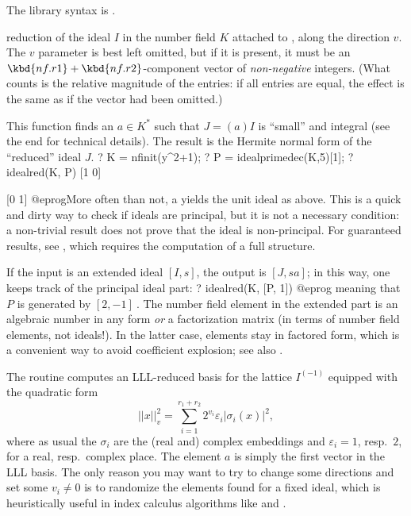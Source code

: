 The library syntax is .

\label{se:idealred}
 reduction of
the ideal $I$ in the number field $K$ attached to , along the
direction $v$. The $v$ parameter is best left omitted, but if it is present,
it must be an $\kbd{nf.r1} + \kbd{nf.r2}$-component vector of
\emph{non-negative} integers. (What counts is the relative magnitude of the
entries: if all entries are equal, the effect is the same as if the vector
had been omitted.)

This function finds an $a\in K^*$ such that $J = (a)I$ is
``small'' and integral (see the end for technical details).
The result is the Hermite normal form of
the ``reduced'' ideal $J$.
\bprog
? K = nfinit(y^2+1);
? P = idealprimedec(K,5)[1];
? idealred(K, P)
[1 0]

[0 1]
@eprog\noindent More often than not, a  yields the unit
ideal as above. This is a quick and dirty way to check if ideals are principal,
but it is not a necessary condition: a non-trivial result does not prove that
the ideal is non-principal. For guaranteed results, see ,
which requires the computation of a full  structure.

If the input is an extended ideal $[I,s]$, the output is $[J, sa]$; in
this way, one keeps track of the principal ideal part:
\bprog
? idealred(K, [P, 1])
@eprog\noindent
meaning that $P$ is generated by $[2, -1]~$. The number field element in the
extended part is an algebraic number in any form \emph{or} a factorization
matrix (in terms of number field elements, not ideals!). In the latter case,
elements stay in factored form, which is a convenient way to avoid
coefficient explosion; see also .

 The routine computes an LLL-reduced
basis for the lattice $I^(-1)$ equipped with the quadratic
form
$$|| x ||_v^2 = \sum_{i=1}^{r_1+r_2} 2^{v_i}\varepsilon_i|\sigma_i(x)|^2,$$
where as usual the $\sigma_i$ are the (real and) complex embeddings and
$\varepsilon_i = 1$, resp.~$2$, for a real, resp.~complex place. The element
$a$ is simply the first vector in the LLL basis. The only reason you may want
to try to change some directions and set some $v_i\neq 0$ is to randomize
the elements found for a fixed ideal, which is heuristically useful in index
calculus algorithms like  and .

